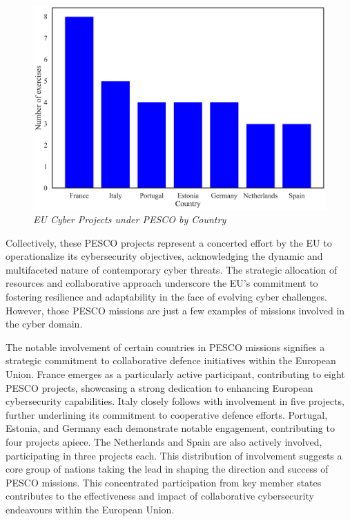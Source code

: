 \begin{figure}[H]
    \centering
    \includegraphics[width=1\textwidth]{Images/cyber_exercises.png}
    \caption{\textit{EU Cyber Projects under PESCO by Country}}
    \label{fig:cyber_exercises}
\end{figure}

Collectively, these PESCO projects represent a concerted effort by the EU to operationalize its cybersecurity objectives, acknowledging the dynamic and multifaceted nature of contemporary cyber threats. The strategic allocation of resources and collaborative approach underscore the EU's commitment to fostering resilience and adaptability in the face of evolving cyber challenges. However, those PESCO missions are just a few examples of missions involved in the cyber domain.

The notable involvement of certain countries in PESCO missions signifies a strategic commitment to collaborative defence initiatives within the European Union. France emerges as a particularly active participant, contributing to eight PESCO projects, showcasing a strong dedication to enhancing European cybersecurity capabilities. Italy closely follows with involvement in five projects, further underlining its commitment to cooperative defence efforts. Portugal, Estonia, and Germany each demonstrate notable engagement, contributing to four projects apiece. The Netherlands and Spain are also actively involved, participating in three projects each. This distribution of involvement suggests a core group of nations taking the lead in shaping the direction and success of PESCO missions. This concentrated participation from key member states contributes to the effectiveness and impact of collaborative cybersecurity endeavours within the European Union.

